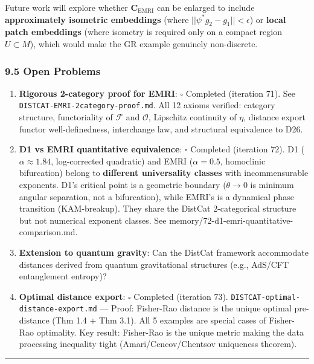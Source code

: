 \documentclass[
]{article}
\providecommand{\tightlist}{%
  \setlength{\itemsep}{0pt}\setlength{\parskip}{0pt}}
\begin{document}
Future work will explore whether \(\mathbf{C}_{\text{EMRI}}\) can be
enlarged to include \textbf{approximately isometric embeddings} (where
\(||\psi^* g_2 - g_1|| < \epsilon\)) or \textbf{local patch embeddings}
(where isometry is required only on a compact region \(U \subset M\)),
which would make the GR example genuinely non-discrete.

\subsubsection{9.5 Open Problems}\label{open-problems}

\begin{enumerate}
\def\labelenumi{\arabic{enumi}.}
\tightlist
\item
  \textbf{Rigorous 2-category proof for EMRI}: \(\square\) Completed
  (iteration 71). See \texttt{DISTCAT-EMRI-2category-proof.md}. All 12
  axioms verified: category structure, functoriality of \(\mathcal{F}\)
  and \(\mathcal{O}\), Lipschitz continuity of \(\eta\), distance export
  functor well-definedness, interchange law, and structural equivalence
  to D26.
\item
  \textbf{D1 vs EMRI quantitative equivalence}: \(\square\) Completed
  (iteration 72). D1 (\(\alpha \approx 1.84\), log-corrected quadratic) and EMRI (\(\alpha = 0.5\),
  homoclinic bifurcation) belong to \textbf{different universality
  classes} with incommensurable exponents. D1's critical point is a
  geometric boundary (\(\theta \to 0\) is minimum angular separation, not a
  bifurcation), while EMRI's is a dynamical phase transition
  (KAM-breakup). They share the DistCat 2-categorical structure but not
  numerical exponent classes. See
  memory/72-d1-emri-quantitative-comparison.md.
\item
  \textbf{Extension to quantum gravity}: Can the DistCat framework
  accommodate distances derived from quantum gravitational structures
  (e.g., AdS/CFT entanglement entropy)?
\item
  \textbf{Optimal distance export}: \(\square\) Completed (iteration
  73). \texttt{DISTCAT-optimal-distance-export.md} --- Proof: Fisher-Rao
  distance is the unique optimal pre-distance (Thm 1.4 + Thm 3.1). All
  5 examples are special cases of Fisher-Rao optimality. Key result:
  Fisher-Rao
  is the unique metric making the data processing inequality tight
  (Amari/Cencov/Chentsov uniqueness theorem).
\end{enumerate}

\begin{center}\rule{0.5\linewidth}{0.5pt}\end{center}
\end{document}
